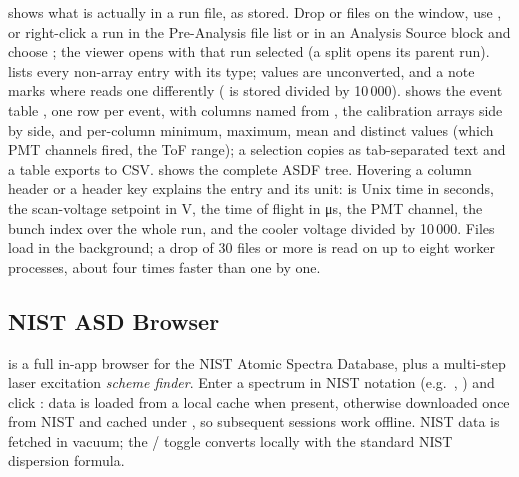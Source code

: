  shows what is actually in
a run file, as stored. Drop  or  files on the
window, use , or right-click a run in the Pre-Analysis
file list or in an Analysis Source block and choose ; the viewer opens with that run selected (a 
split opens its parent run).  lists every non-array entry
with its type; values are unconverted, and a note marks where \denis{}
reads one differently ( is stored divided by
10\,000).  shows the event table , one row per
event, with columns named from , the calibration
arrays side by side, and per-column minimum, maximum, mean and
distinct values (which PMT channels fired, the ToF range); a selection
copies as tab-separated text and a table exports to CSV. 
shows the complete ASDF tree. Hovering a column header or a header
key explains the entry and its unit:  is Unix time in
seconds,  the scan-voltage setpoint in V, 
the time of flight in \si{\micro\second},  the PMT
channel,  the bunch index over the whole run, and
 the cooler voltage divided by 10\,000. Files load in the
background; a drop of 30 files or more is read on up to eight worker
processes, about four times faster than one by one.

\subsection{NIST ASD Browser}

 is a full in-app
browser for the NIST Atomic Spectra Database, plus a multi-step
laser excitation \emph{scheme finder}. Enter a spectrum in NIST
notation (e.g.\ , ) and click :
data is loaded from a local cache when present, otherwise downloaded
once from NIST and cached under , so
subsequent sessions work offline. NIST data is fetched in vacuum;
the / toggle converts locally with the standard
NIST dispersion formula.

